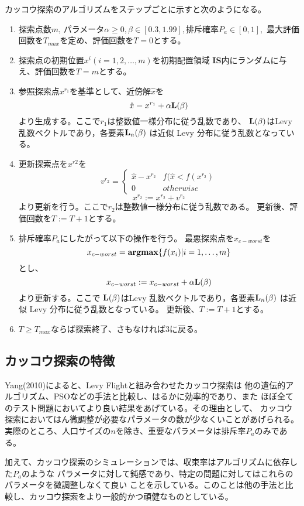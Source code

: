 \documentclass[uplatex]{jsarticle}
\begin{document}
カッコウ探索のアルゴリズムをステップごとに示すと次のようになる。

\begin{enumerate}
  \item 探索点数$m$, パラメータ$\alpha \geq 0, \beta \in [0.3, 1.99], 排斥確率P_a \in [0,1],$
  最大評価回数を$T_{max}$を定め、評価回数を$T = 0$とする。
  \item 探索点の初期位置$x^i(i=1,2, \ldots, m)$を初期配置領域
  {\bf IS}内にランダムに与え、評価回数を$T = m$とする。
  \item 参照探索点$x^{r_1}$を基準として、近傍解${\hat x}$を
  $$\hat{x} = x^{r_1} + \alpha {\bf L}(\beta) $$
  より生成する。ここで$r_1$は整数値一様分布に従う乱数であり、
${\bf L}(\beta)$はLevy 乱数ベクトルであり，各要素${\bf L}_n(\beta)$ は近似 Levy 分布に従う乱数となっている。
\item 更新探索点を$x^{r2}$を
\[
  v^{r_2} = \begin{cases}
    \hat{x} - x^{r_2} & f(\hat{x} < f(x^{r_2}) \\
    0 & otherwise
  \end{cases}
\]
$$x^{r_2} := x^{r_2} + v^{r_2} $$
より更新を行う。ここで$r_2$は整数値一様分布に従う乱数である。
更新後、評価回数を$T := T + 1$とする。
\item 排斥確率$P_a$にしたがって以下の操作を行う。
最悪探索点を$x_{c-worst}$を
$$x_{c-worst} = {\bf argmax}\{f(x_i)| i = 1, \ldots, m\}$$
とし、
$$x_{c-worst} := x_{c-worst} + \alpha {\bf L}(\beta)$$
より更新する。ここで
${\bf L}(\beta)$はLevy 乱数ベクトルであり，各要素${\bf L}_n(\beta)$ は近似 Levy 分布に従う乱数となっている。
更新後、$T := T +1$とする。

\item $T \geq T_{max}$ならば探索終了、さもなければ3に戻る。
\end{enumerate}

\subsection{カッコウ探索の特徴}
Yang(2010)によると、Levy Flightと組み合わせたカッコウ探索は
他の遺伝的アルゴリズム、PSOなどの手法と比較し、はるかに効率的であり、また
ほぼ全てのテスト問題においてより良い結果をあげている。その理由として、
カッコウ探索においてはん微調整が必要なパラメータの数が少なくいことがあげられる。
実際のところ、人口サイズの$n$を除き、重要なパラメータは排斥率$P_a$のみである。

加えて、カッコウ探索のシミュレーションでは、収束率はアルゴリズムに依存した$P_a$のような
パラメータに対して鈍感であり、特定の問題に対してはこれらのパラメータを微調整しなくて良い
ことを示している。このことは他の手法と比較し、カッコウ探索をより一般的かつ頑健なものとしている。
\end{document}
